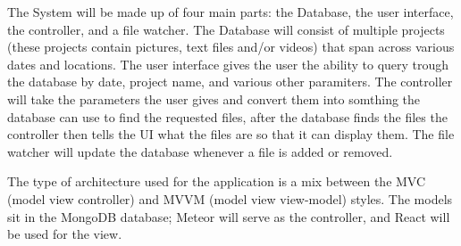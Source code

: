 The System will be made up of four main parts: the Database, the user interface,
the controller, and a file watcher. The Database will consist of multiple
projects (these projects contain pictures, text files and/or videos) that span
across various dates and locations. The user interface gives the user the
ability to query trough the database by date, project name, and various other
paramiters. The controller will take the parameters the user gives and convert
them into somthing the database can use to find the requested files, after the
database finds the files the controller then tells the UI what the files are so
that it can display them. The file watcher will update the database whenever a
file is added or removed.

The type of architecture used for the application is a mix between the MVC
(model view controller) and MVVM (model view view-model) styles. The models sit
in the MongoDB database; Meteor will serve as the controller, and React will be
used for the view.
